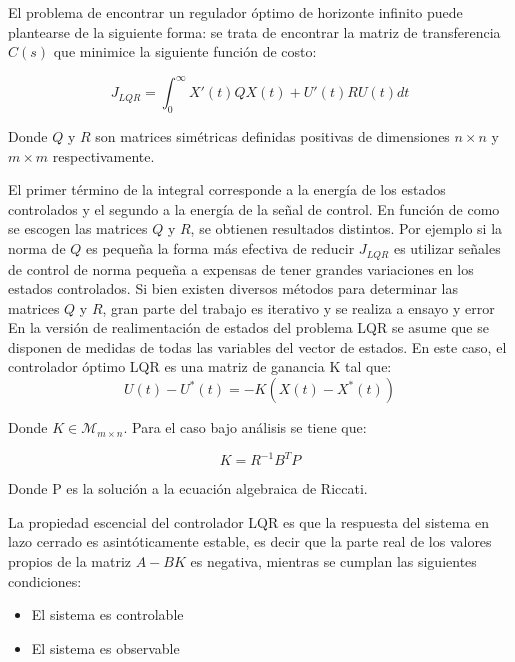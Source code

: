 \documentclass[main]{subfiles}
\begin{document}
El problema de encontrar un regulador \'optimo de horizonte infinito puede plantearse de la siguiente forma: se trata de encontrar la matriz de transferencia $C(s)$ que minimice la siguiente funci\'on de costo:

\begin{equation}
\label{eq:lqr}
J_{LQR} = \int_{0}^{\infty}  X'(t)Q X(t)+U'(t)RU(t)dt
\end{equation}

Donde $Q$ y $R$ son matrices sim\'etricas definidas positivas de dimensiones $n\times n$ y $m\times m$ respectivamente. 

El primer t\'ermino de la integral corresponde a la energ\'ia de los estados controlados y el segundo a la energ\'ia de la señal de control. En funci\'on de como se escogen las matrices $Q$ y $R$, se obtienen resultados distintos. Por ejemplo si la norma de $Q$ es pequeña la forma m\'as efectiva de reducir $J_{LQR}$ es utilizar señales de control de norma pequeña a expensas de tener grandes variaciones en los estados controlados. Si bien existen diversos m\'etodos para determinar las matrices $Q$ y $R$, gran parte del trabajo es iterativo y se realiza a ensayo y error\\  

En la versi\'on de realimentaci\'on de estados del problema LQR se asume que se disponen de medidas de todas las variables del vector de estados. En este caso, el controlador \'optimo LQR es una matriz de ganancia K tal que:
\begin{equation}
U(t)-U^*(t) = -K(X(t)-X^*(t))
\end{equation}

Donde $K\in\mathcal{M}_{m\times n}$. Para el caso bajo an\'alisis se tiene que: 

\begin{equation}
K = R^{-1}B^TP
\end{equation}

Donde P es la soluci\'on a la ecuaci\'on algebraica de Riccati.

La propiedad escencial del controlador LQR es que la respuesta del sistema en lazo cerrado es asint\'oticamente estable, es decir que la parte real de los valores propios de la matriz $A-BK$ es negativa, mientras se cumplan las siguientes condiciones:

\begin{itemize}
\item El sistema es controlable
\item El sistema es observable
\end{itemize}
\end{document}
